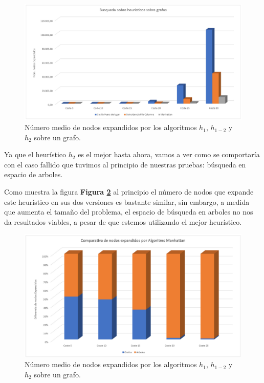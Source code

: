\documentclass[runningheads]{llncs}
\begin{document}
\begin{figure}
	\centering
	\includegraphics[width=\textwidth]{ejercicio3_2.jpg}
	\caption{Número medio de nodos expandidos por los algoritmos $ h_1 $, $ h_{1-2} $ y $ h_2 $ sobre un grafo.} 
	\label{figura_heuristicos_1_2}
\end{figure}

Ya que el heurístico $ h_2 $ es el mejor hasta ahora, vamos a ver como se comportaría con el caso fallido que tuvimos al principio de nuestras pruebas: búsqueda en espacio de arboles. 

Como muestra la figura \textbf{Figura \ref{figura_Manhattan_arbol}} al principio el número de nodos que expande este heurístico en sus dos versiones es bastante similar, sin embargo, a medida que aumenta el tamaño del problema, el espacio de búsqueda en arboles no nos da resultados viables, a pesar de que estemos utilizando el mejor heurístico.

\begin{figure}
	\centering
	\includegraphics[width=\textwidth]{ejercicio3_3.jpg}
	\caption{Número medio de nodos expandidos por los algoritmos $ h_1 $, $ h_{1-2} $ y $ h_2 $ sobre un grafo.} 
	\label{figura_Manhattan_arbol}
\end{figure}
\end{document}
